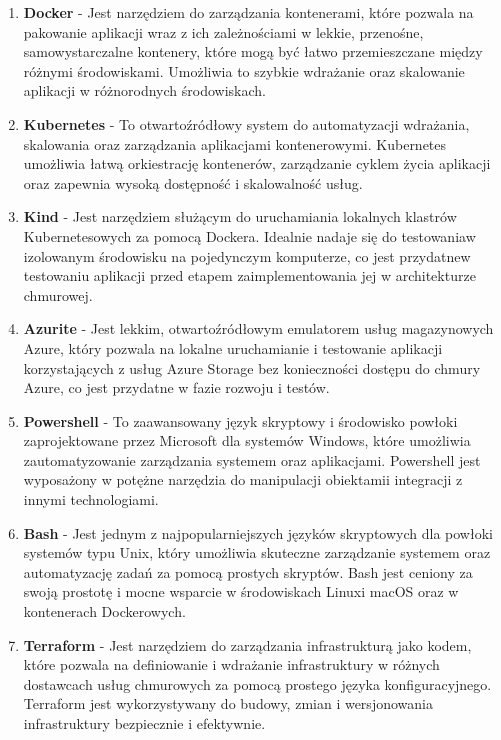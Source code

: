 \begin{enumerate}

\item {\bf Docker} - Jest narzędziem do zarządzania kontenerami, które pozwala na pakowanie aplikacji wraz z ich zależnościami w lekkie, przenośne, samowystarczalne kontenery, które mogą być łatwo przemieszczane między różnymi środowiskami. Umożliwia to szybkie wdrażanie oraz skalowanie aplikacji w różnorodnych środowiskach.

\item {\bf Kubernetes} - To otwartoźródłowy system do automatyzacji wdrażania, skalowania oraz zarządzania aplikacjami kontenerowymi. Kubernetes umożliwia łatwą orkiestrację kontenerów, zarządzanie cyklem życia aplikacji oraz zapewnia wysoką dostępność i skalowalność usług.

\item {\bf Kind} - Jest narzędziem służącym do uruchamiania lokalnych klastrów Kubernetesowych za pomocą Dockera. Idealnie nadaje się do testowania\linebreak w izolowanym środowisku na pojedynczym komputerze, co jest przydatne\linebreak w testowaniu aplikacji przed etapem zaimplementowania jej w architekturze chmurowej.

\item {\bf Azurite} - Jest lekkim, otwartoźródłowym emulatorem usług magazynowych Azure, który pozwala na lokalne uruchamianie i testowanie aplikacji korzystających z usług Azure Storage bez konieczności dostępu do chmury Azure, co jest przydatne w fazie rozwoju i testów.

\item {\bf Powershell} - To zaawansowany język skryptowy i środowisko powłoki zaprojektowane przez Microsoft dla systemów Windows, które umożliwia zautomatyzowanie zarządzania systemem oraz aplikacjami. Powershell jest wyposażony w potężne narzędzia do manipulacji obiektami\linebreak i integracji z innymi technologiami.

\item {\bf Bash} - Jest jednym z najpopularniejszych języków skryptowych dla powłoki systemów typu Unix, który umożliwia skuteczne zarządzanie systemem oraz automatyzację zadań za pomocą prostych skryptów. Bash jest ceniony za swoją prostotę i mocne wsparcie w środowiskach Linux\linebreak i macOS oraz w kontenerach Dockerowych.

\item {\bf Terraform} - Jest narzędziem do zarządzania infrastrukturą jako kodem, które pozwala na definiowanie i wdrażanie infrastruktury w różnych dostawcach usług chmurowych za pomocą prostego języka konfiguracyjnego. Terraform jest wykorzystywany do budowy, zmian i wersjonowania infrastruktury bezpiecznie i efektywnie.


\end{enumerate}
